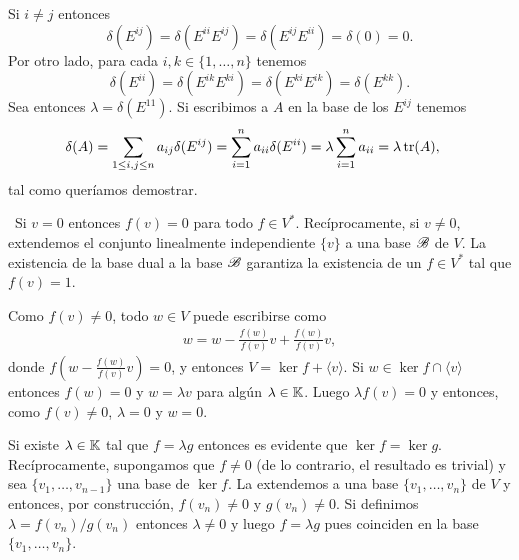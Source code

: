 \begin{solution}
    Si $i\ne j$ entonces 
    \[
        \delta(E^{ij})=\delta(E^{ii}E^{ij})=\delta(E^{ij}E^{ii})=\delta(0)=0.
    \]
    Por otro lado, para cada $i,k\in\{1,\dots,n\}$ tenemos 
    \[
        \delta(E^{ii})=\delta(E^{ik}E^{ki})=\delta(E^{ki}E^{ik})=\delta(E^{kk}).
    \]
    Sea entonces $\lambda=\delta(E^{11})$. Si
    escribimos a $A$ en la base de los $E^{ij}$ tenemos
    \begin{align*}
        \delta(A) & %
        =\sum_{1\leq i,j\leq n}a_{ij}\delta(E^{ij})
        =\sum_{i=1}^n a_{ii}\delta(E^{ii})
        =\lambda\sum_{i=1}^na_{ii}
        =\lambda\tr(A),
    \end{align*}
    tal como queríamos demostrar.
\end{solution}
\begin{solution}[ejercicio~\ref{xca:v=0<=>f(v)=0}]\
    Si $v=0$ entonces $f(v)=0$ para todo $f\in V^*$.
    Recíprocamente, si $v\ne0$, extendemos el conjunto linealmente
    independiente $\{v\}$ a una base $\mathscr{B}$ de $V$. La existencia de la
    base dual a la base $\mathscr{B}$ garantiza la existencia de un $f\in V^*$ tal que
    $f(v)=1$. 
\end{solution}

\begin{solution}[ejercicio~\ref{xca:V=<v>+kerf}]
    Como $f(v)\ne0$, todo $w\in V$ puede
    escribirse como 
    \begin{align*}
        w=w-\frac{f(w)}{f(v)}v+\frac{f(w)}{f(v)}v,
    \end{align*}
    donde $f\left(w-\frac{f(w)}{f(v)}v\right)=0$, y entonces $V=\ker
    f+\langle v\rangle$.  Si $w\in\ker f\cap\langle v\rangle$ entonces
    $f(w)=0$ y $w=\lambda v$ para algún $\lambda\in\mathbb{K}$. Luego $\lambda
    f(v)=0$ y entonces, como $f(v)\ne0$, $\lambda=0$ y $w=0$.
\end{solution}

\begin{solution}[ejercicio~\ref{xca:kerf=kerg}]
    Si existe $\lambda\in\mathbb{K}$ tal que $f=\lambda g$ entonces es
    evidente que $\ker f=\ker g$. Recíprocamente, supongamos que
    $f\ne0$ (de lo contrario, el resultado es trivial) y sea
    $\{v_1,\dots,v_{n-1}\}$ una base de $\ker f$. La extendemos a una
    base $\{v_1,\dots,v_n\}$ de $V$ y entonces, por construcción,
    $f(v_n)\ne0$ y $g(v_n)\ne0$.  Si definimos $\lambda=f(v_n)/g(v_n)$
    entonces $\lambda\ne0$ y luego $f=\lambda g$ pues coinciden en la
    base $\{v_1,\dots,v_n\}$.
\end{solution}

